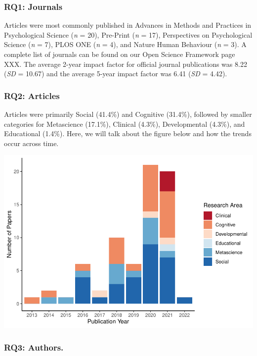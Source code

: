 \documentclass[
  man]{apa6}
\begin{document}
\hypertarget{rq1-journals-1}{%
\subsubsection{RQ1: Journals}\label{rq1-journals-1}}

Articles were most commonly published in Advances in Methods and Practices in Psychological Science (\emph{n} = 20), Pre-Print (\emph{n} = 17), Perspectives on Psychological Science (\emph{n} = 7), PLOS ONE (\emph{n} = 4), and Nature Human Behaviour (\emph{n} = 3). A complete list of journals can be found on our Open Science Framework page XXX. The average 2-year impact factor for official journal publications was 8.22 (\emph{SD} = 10.67) and the average 5-year impact factor was 6.41 (\emph{SD} = 4.42).

\hypertarget{rq2-articles-1}{%
\subsubsection{RQ2: Articles}\label{rq2-articles-1}}

Articles were primarily Social (41.4\%) and Cognitive (31.4\%), followed by smaller categories for Metascience (17.1\%), Clinical (4.3\%), Developmental (4.3\%), and Educational (1.4\%). Here, we will talk about the figure below and how the trends occur across time.

\includegraphics{04.manuscript_files/figure-latex/figure1-1.pdf}

\hypertarget{rq3-authors.-1}{%
\subsubsection{\texorpdfstring{RQ3: Authors.\\
}{RQ3: Authors. }}\label{rq3-authors.-1}}
\end{document}
